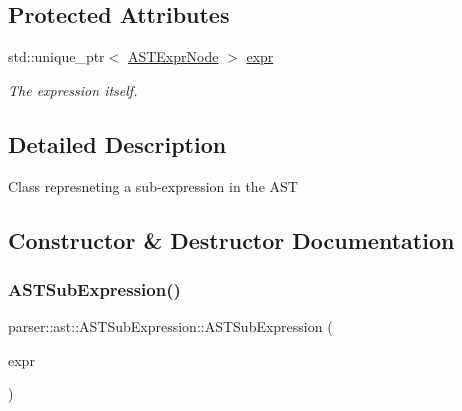 \subsection*{Protected Attributes}
\begin{DoxyCompactItemize}
\item 
\mbox{\label{classparser_1_1ast_1_1ASTSubExpression_abccfde1fa38ce0cdd3bc60993ae0e493}} 
std\+::unique\+\_\+ptr$<$ \hyperlink{classparser_1_1ast_1_1ASTExprNode}{A\+S\+T\+Expr\+Node} $>$ \hyperlink{classparser_1_1ast_1_1ASTSubExpression_abccfde1fa38ce0cdd3bc60993ae0e493}{expr}
\begin{DoxyCompactList}\small\item\em The expression itself. \end{DoxyCompactList}\end{DoxyCompactItemize}


\subsection{Detailed Description}
Class represneting a sub-\/expression in the A\+ST 

\subsection{Constructor \& Destructor Documentation}
\mbox{\label{classparser_1_1ast_1_1ASTSubExpression_ad3c1de057f3edff4ce3e30d449cf0654}} 
\subsubsection{\texorpdfstring{A\+S\+T\+Sub\+Expression()}{ASTSubExpression()}}
{\footnotesize\ttfamily parser\+::ast\+::\+A\+S\+T\+Sub\+Expression\+::\+A\+S\+T\+Sub\+Expression (\begin{DoxyParamCaption}\item[{std\+::unique\+\_\+ptr$<$ \hyperlink{classparser_1_1ast_1_1ASTExprNode}{A\+S\+T\+Expr\+Node} $>$}]{expr }\end{DoxyParamCaption})}


